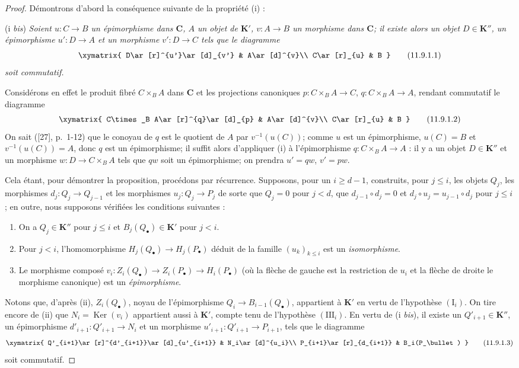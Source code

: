 \begin{proof}
Démontrons d'abord la conséquence suivante de la propriété (i) :

(i \emph{bis}) \emph{Soient $u:C\to B$ un épimorphisme dans $\boldsymbol{C}$, $A$ un
objet de $\boldsymbol{K}'$, $v:A\to B$ un morphisme dans $\boldsymbol{C}$; il existe alors un
objet $D\in\boldsymbol{K}''$, un épimorphisme $u':D\to A$ et un morphisme $v':D\to C$
tels que le diagramme}
\[
\xymatrix{
D\ar[r]^{u'}\ar[d]_{v'} & A\ar[d]^{v}\\
C\ar[r]_{u} & B
}
\tag{11.9.1.1}\label{0.11.9.1.1-fr}
\]
\emph{soit commutatif.}

Considérons en effet le produit fibré $C\times_B A$ dans $\boldsymbol{C}$ et les
projections canoniques $p:C\times_B A\to C$, $q:C\times_B A\to A$, rendant
commutatif le diagramme
\[
\xymatrix{
C\times_B A\ar[r]^{q}\ar[d]_{p} & A\ar[d]^{v}\\
C\ar[r]_{u} & B
}
\tag{11.9.1.2}\label{0.11.9.1.2-fr}
\]
On sait ([27], p.~1-12) que le conoyau de $q$ est le quotient de $A$ par
$v^{-1}(u(C))$; comme $u$ est un épimorphisme, $u(C)=B$ et
$v^{-1}(u(C))=A$, donc $q$ est un épimorphisme; il suffit alors d'appliquer
(i) à l'épimorphisme $q:C\times_B A\to A$ : il y a un objet $D\in\boldsymbol{K}''$ et un
morphisme $w:D\to C\times_B A$ tels que $qw$ soit un épimorphisme; on
prendra $u'=qw$, $v'=pw$.

Cela étant, pour démontrer la proposition, procédons par récurrence.
Supposons, pour un $i\geq d-1$, construits, pour $j\leq i$, les objets $Q_j$,
les morphismes $d_j:Q_j\to Q_{j-1}$ et les morphismes $u_j:Q_j\to P_j$ de
sorte que $Q_j=0$ pour $j<d$, que $d_{j-1}\circ d_j=0$ et
$d_j\circ u_j=u_{j-1}\circ d_j$ pour $j\leq i$; en outre, nous supposons
vérifiées les conditions suivantes :
\begin{enumerate}
\item[$(\mathrm I_i)$] On a $Q_j\in\boldsymbol{K}''$ pour $j\leq i$ et
$B_j(Q_\bullet)\in\boldsymbol{K}'$ pour $j<i$.
\item[$(\mathrm{II}_i)$] Pour $j<i$, l'homomorphisme
$H_j(Q_\bullet)\to H_j(P_\bullet)$ déduit de la famille $(u_k)_{k\leq i}$
est un \emph{isomorphisme}.
\item[$(\mathrm{III}_i)$] Le morphisme composé
$v_i:Z_i(Q_\bullet)\to Z_i(P_\bullet)
\to H_i(P_\bullet)$
(où la flèche de gauche est la restriction de $u_i$ et la flèche de droite
le morphisme canonique) est un \emph{épimorphisme}.
\end{enumerate}
Notons que, d'après (ii), $Z_i(Q_\bullet)$, noyau de l'épimorphisme
$Q_i\to B_{i-1}(Q_\bullet)$, appartient à $\boldsymbol{K}'$ en vertu de l'hypothèse
$(\mathrm I_i)$. On tire encore de (ii) que
$N_i=\operatorname{Ker}(v_i)$ appartient aussi à $\boldsymbol{K}'$, compte tenu de
l'hypothèse $(\mathrm{III}_i)$. En vertu de (i \emph{bis}), il existe un
$Q'_{i+1}\in\boldsymbol{K}''$, un épimorphisme $d'_{i+1}:Q'_{i+1}\to N_i$ et un
morphisme $u'_{i+1}:Q'_{i+1}\to P_{i+1}$, tels que le diagramme
\[
\xymatrix{
Q'_{i+1}\ar[r]^{d'_{i+1}}\ar[d]_{u'_{i+1}} &
N_i\ar[d]^{u_i}\\
P_{i+1}\ar[r]_{d_{i+1}} & B_i(P_\bullet)
}
\tag{11.9.1.3}\label{0.11.9.1.3-fr}
\]
soit commutatif.


\end{proof}
